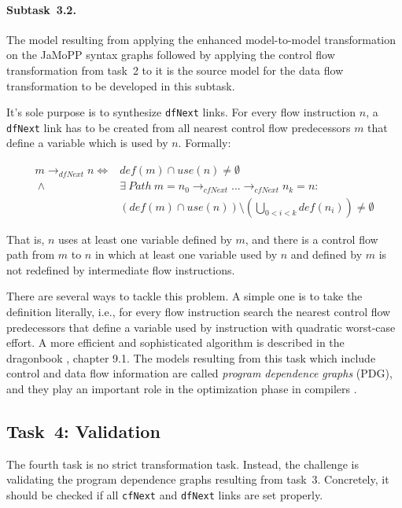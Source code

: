 \documentclass[submission]{eptcs}
\begin{document}
\paragraph{Subtask~3.2.}
\label{sec:subtask-3.2}

The model resulting from applying the enhanced model-to-model transformation on
the JaMoPP syntax graphs followed by applying the control flow transformation
from task~2 to it is the source model for the data flow transformation to be
developed in this subtask.

It's sole purpose is to synthesize \verb|dfNext| links.  For every flow
instruction $n$, a \verb|dfNext| link has to be created from all nearest
control flow predecessors $m$ that define a variable which is used by $n$.
Formally:

\begin{align*}
  m \rightarrow_{dfNext} n  \iff {} & def(m) \cap use(n) \neq \emptyset\\
  ~\land {} & \exists~Path~m = n_0 \rightarrow_{cfNext} ... \rightarrow_{cfNext} n_k = n:\\
  & \left(def(m) \cap use(n)\right) \setminus \left(\bigcup_{0 < i < k}
    def(n_i)\right) \neq \emptyset
\end{align*}

That is, $n$ uses at least one variable defined by $m$, and there is a control
flow path from $m$ to $n$ in which at least one variable used by $n$ and
defined by $m$ is not redefined by intermediate flow instructions.

There are several ways to tackle this problem.  A simple one is to take the
definition literally, i.e., for every flow instruction search the nearest
control flow predecessors that define a variable used by instruction with
quadratic worst-case effort.  A more efficient and sophisticated algorithm is
described in the dragonbook \cite{Aho:CPTT}, chapter 9.1.  The models resulting
from this task which include control and data flow information are called
\emph{program dependence graphs} (PDG), and they play an important role in the
optimization phase in compilers \cite{Ferrante:1987:PDG:24039.24041}.


\subsection{Task~4: Validation}
\label{sec:task4-validation}

The fourth task is no strict transformation task.  Instead, the challenge is
validating the program dependence graphs resulting from task~3.  Concretely, it
should be checked if all \verb|cfNext| and \verb|dfNext| links are set
properly.
\end{document}

